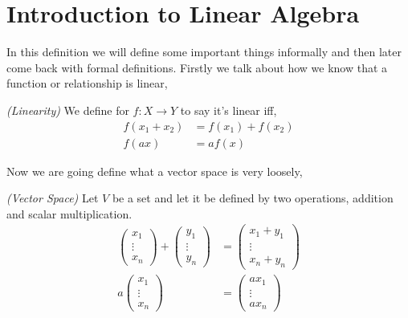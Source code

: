 \documentclass{article}
\begin{document}
  \maketitle

  \section{Introduction to Linear Algebra}
  In this definition we will define some important things informally and then later come back with formal definitions. Firstly we talk about how we know that a function or relationship is linear,

  \begin{ndefi}{\textit{(Linearity)}}
    We define for $f : X \to Y$ to say it's linear iff,
    \begin{align*}
      f(x_1 + x_2) &= f(x_1) + f(x_2)\\
      f(ax) &= af(x)
    \end{align*}
  \end{ndefi}
  Now we are going define what a vector space is very loosely,
  \begin{ndefi}{\textit{(Vector Space)}}
    Let $V$ be a set and let it be defined by two operations, addition and scalar multiplication.
    \begin{align*}
      \begin{pmatrix}
        x_1 \\ \vdots \\ x_n
      \end{pmatrix} + \begin{pmatrix}
        y_1 \\ \vdots \\ y_n
      \end{pmatrix} &= \begin{pmatrix}
        x_1 + y_1 \\ \vdots \\ x_n + y_n
      \end{pmatrix} \\
      a\begin{pmatrix}
        x_1 \\ \vdots \\ x_n
      \end{pmatrix} &= \begin{pmatrix}
        ax_1 \\ \vdots \\ ax_n
      \end{pmatrix}
    \end{align*}
  \end{ndefi}
\end{document}
